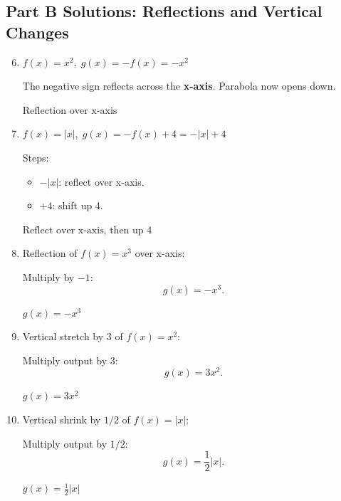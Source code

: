 \documentclass[14pt]{extarticle}
\begin{document}
\subsection*{Part B Solutions: Reflections and Vertical Changes}
\begin{enumerate}
  \setcounter{enumi}{5}
  \item \(f(x) = x^2,\; g(x) = -f(x) = -x^2\)

  The negative sign reflects across the \textbf{x-axis}. Parabola now opens down.

  \(\boxed{\text{Reflection over x-axis}}\)

  \item \(f(x) = |x|,\; g(x) = -f(x) + 4 = -|x| + 4\)

  Steps:
  \begin{itemize}
    \item \(-|x|\): reflect over x-axis.
    \item \(+4\): shift up 4.
  \end{itemize}

  \(\boxed{\text{Reflect over x-axis, then up 4}}\)

  \item Reflection of \(f(x) = x^3\) over x-axis:

  Multiply by \(-1\):
  \[
  g(x) = -x^3.
  \]

  \(\boxed{g(x) = -x^3}\)

  \item Vertical stretch by 3 of \(f(x) = x^2\):

  Multiply output by 3:
  \[
  g(x) = 3x^2.
  \]

  \(\boxed{g(x) = 3x^2}\)

  \item Vertical shrink by \(1/2\) of \(f(x) = |x|\):

  Multiply output by \(1/2\):
  \[
  g(x) = \frac{1}{2}|x|.
  \]

  \(\boxed{g(x) = \tfrac{1}{2}|x|}\)
\end{enumerate}
\end{document}
